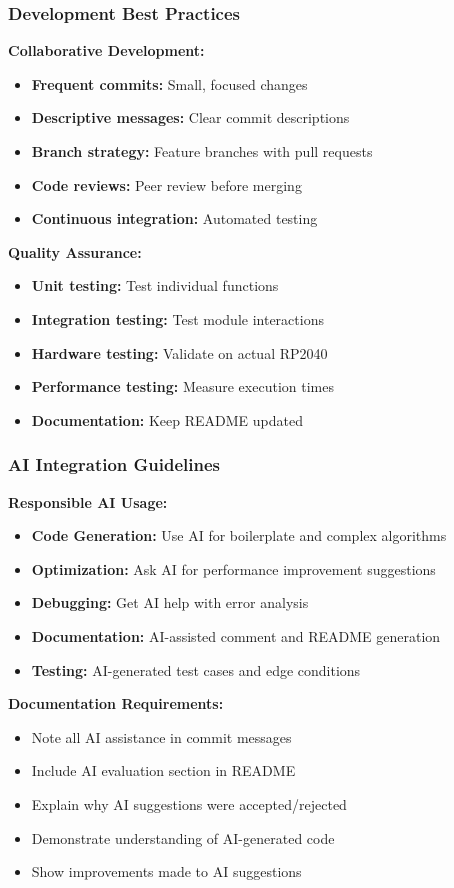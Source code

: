 \documentclass{beamer}
\begin{document}
\begin{frame}
\frametitle{Development Best Practices}
\textbf{Collaborative Development:}
\begin{itemize}
    \item \textbf{Frequent commits:} Small, focused changes
    \item \textbf{Descriptive messages:} Clear commit descriptions
    \item \textbf{Branch strategy:} Feature branches with pull requests
    \item \textbf{Code reviews:} Peer review before merging
    \item \textbf{Continuous integration:} Automated testing
\end{itemize}

\vspace{0.5cm}
\textbf{Quality Assurance:}
\begin{itemize}
    \item \textbf{Unit testing:} Test individual functions
    \item \textbf{Integration testing:} Test module interactions
    \item \textbf{Hardware testing:} Validate on actual RP2040
    \item \textbf{Performance testing:} Measure execution times
    \item \textbf{Documentation:} Keep README updated
\end{itemize}
\end{frame}

\begin{frame}
\frametitle{AI Integration Guidelines}
\textbf{Responsible AI Usage:}
\begin{itemize}
    \item \textbf{Code Generation:} Use AI for boilerplate and complex algorithms
    \item \textbf{Optimization:} Ask AI for performance improvement suggestions
    \item \textbf{Debugging:} Get AI help with error analysis
    \item \textbf{Documentation:} AI-assisted comment and README generation
    \item \textbf{Testing:} AI-generated test cases and edge conditions
\end{itemize}

\vspace{0.5cm}
\textbf{Documentation Requirements:}
\begin{itemize}
    \item Note all AI assistance in commit messages
    \item Include AI evaluation section in README
    \item Explain why AI suggestions were accepted/rejected
    \item Demonstrate understanding of AI-generated code
    \item Show improvements made to AI suggestions
\end{itemize}
\end{frame}
\end{document}
